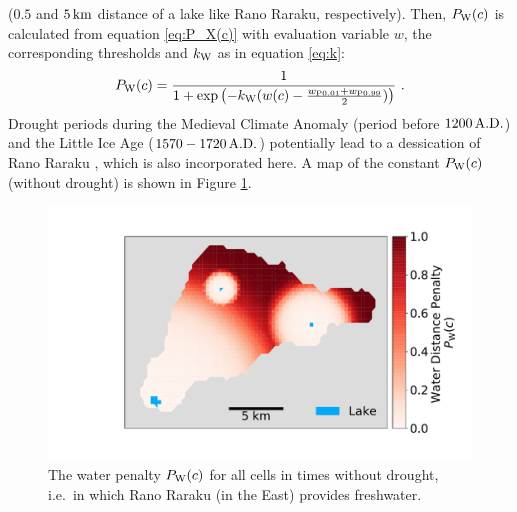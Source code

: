 ($0.5$ and $5\, {\rm km}$ distance of a lake like Rano Raraku, respectively).
Then, $P_{\rm W}(c)$ is calculated from equation \ref{eq:P_X(c)} with evaluation variable $w$, the corresponding thresholds and $k_{\rm W}$ as in equation \ref{eq:k}:
\begin{equation}
	P_{\rm W}(c) = \frac{1}{1+\exp\left( - k_{\rm W} (w(c)-\frac{w_{\rm P0.01}+w_{\rm P0.99}}{2}) \right)} \ .
\end{equation}
Drought periods during the Medieval Climate Anomaly (period before $1200\, {\rm A.D.}$) and the Little Ice Age ($1570-1720 \, {\rm A.D.}$) potentially lead to a dessication of Rano Raraku \citep{Rull2020}, which is also incorporated here. 
A map of the constant $P_{\rm W}(c)$ (without drought) is shown in Figure \ref{fig:plotpw}. 
\begin{figure}
	\centering
	\includegraphics[width=1\linewidth]{images/Plot_PW}
	\caption{The water penalty $P_{\rm W}(c)$ for all cells in times without drought, i.e.\ in which Rano Raraku (in the East) provides freshwater.}
	\label{fig:plotpw}
\end{figure}


